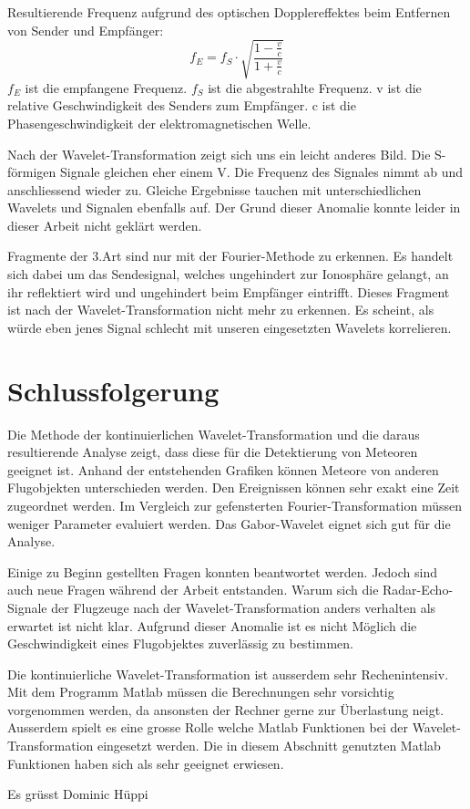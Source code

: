 \begin{refsection}
Resultierende Frequenz aufgrund des optischen Dopplereffektes beim Entfernen von Sender und Empfänger:
\[
f_E
=
f_S\cdot\sqrt{\frac{1-\frac{v}{c}}{1+\frac{v}{c}}}
\]
\(f_E\) ist die empfangene Frequenz.
\(f_S\) ist die abgestrahlte Frequenz.
v ist die relative Geschwindigkeit des Senders zum Empfänger.
c ist die Phasengeschwindigkeit der elektromagnetischen Welle.

Nach der Wavelet-Transformation zeigt sich uns ein leicht anderes Bild.
Die S-förmigen Signale gleichen eher einem V.
Die Frequenz des Signales nimmt ab und anschliessend wieder zu.
Gleiche Ergebnisse tauchen mit unterschiedlichen Wavelets und Signalen ebenfalls auf.
Der Grund dieser Anomalie konnte leider in dieser Arbeit nicht geklärt werden.

Fragmente der 3.Art sind nur mit der Fourier-Methode zu erkennen.
Es handelt sich dabei um das Sendesignal, welches ungehindert zur Ionosphäre gelangt, an ihr reflektiert wird und ungehindert beim Empfänger eintrifft.
Dieses Fragment ist nach der Wavelet-Transformation nicht mehr zu erkennen.
Es scheint, als würde eben jenes Signal schlecht mit unseren eingesetzten Wavelets korrelieren. 

\section{Schlussfolgerung}

Die Methode der kontinuierlichen Wavelet-Transformation und die daraus resultierende Analyse zeigt, dass diese für die Detektierung von Meteoren geeignet ist.
Anhand der entstehenden Grafiken können Meteore von anderen Flugobjekten unterschieden werden.
Den Ereignissen können sehr exakt eine Zeit zugeordnet werden.
Im Vergleich zur gefensterten Fourier-Transformation müssen weniger Parameter evaluiert werden.
Das Gabor-Wavelet eignet sich gut für die Analyse.

Einige zu Beginn gestellten Fragen konnten beantwortet werden.
Jedoch sind auch neue Fragen während der Arbeit entstanden.
Warum sich die Radar-Echo-Signale der Flugzeuge nach der Wavelet-Transformation anders verhalten als erwartet ist nicht klar.
Aufgrund dieser Anomalie ist es nicht Möglich die Geschwindigkeit eines Flugobjektes zuverlässig zu bestimmen.

Die kontinuierliche Wavelet-Transformation ist ausserdem sehr Rechenintensiv. 
Mit dem Programm Matlab müssen die Berechnungen sehr vorsichtig vorgenommen werden, da ansonsten der Rechner gerne zur Überlastung neigt.
Ausserdem spielt es eine grosse Rolle welche Matlab Funktionen bei der Wavelet-Transformation eingesetzt werden.
Die in diesem Abschnitt genutzten Matlab Funktionen haben sich als sehr geeignet erwiesen.  

Es grüsst Dominic Hüppi

\printbibliography[heading=subbibliography]
\end{refsection}
